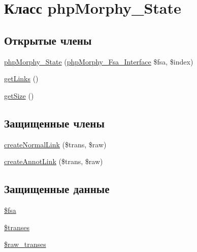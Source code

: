 \hypertarget{classphpMorphy__State}{
\section{Класс phpMorphy\_\-State}
\label{classphpMorphy__State}
}
\subsection*{Открытые члены}
\begin{DoxyCompactItemize}
\item 
\hyperlink{classphpMorphy__State_ac6b13b5e36d37e575b122dec5a513491}{phpMorphy\_\-State} (\hyperlink{interfacephpMorphy__Fsa__Interface}{phpMorphy\_\-Fsa\_\-Interface} \$fsa, \$index)
\item 
\hyperlink{classphpMorphy__State_a9cf372defb12c3052cc07380539215fe}{getLinks} ()
\item 
\hyperlink{classphpMorphy__State_ac447c65b8c34e193bb8c13d6aaf611c2}{getSize} ()
\end{DoxyCompactItemize}
\subsection*{Защищенные члены}
\begin{DoxyCompactItemize}
\item 
\hyperlink{classphpMorphy__State_a0931cfd45d7da31775d068866e36c95e}{createNormalLink} (\$trans, \$raw)
\item 
\hyperlink{classphpMorphy__State_acf8ac1fc0dbdb7414d82bcd35132b1ab}{createAnnotLink} (\$trans, \$raw)
\end{DoxyCompactItemize}
\subsection*{Защищенные данные}
\begin{DoxyCompactItemize}
\item 
\hyperlink{classphpMorphy__State_a72e54b687728b9920fefaa50ca3db195}{\$fsa}
\item 
\hyperlink{classphpMorphy__State_a105df0a0e8be41e05c31b5ed556c18c3}{\$transes}
\item 
\hyperlink{classphpMorphy__State_aaf8a73718f71c4a0c6ff65bac440cc30}{\$raw\_\-transes}
\end{DoxyCompactItemize}


